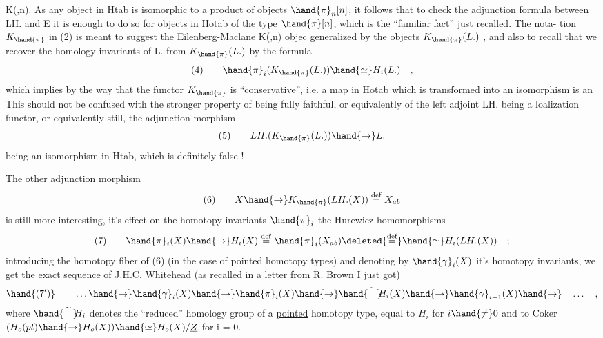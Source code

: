 K(\hand{$\pi$},n). As any object in Htab  is isomorphic to a
product of objects $\hand{\pi}_n[n]$, it follows that   to check the adjunction
formula between LH. and E it is enough to do so for objects in Hotab
of the type $\hand{\pi}[n]$, which is the ``familiar fact'' just recalled. The nota-%
tion $K_{\hand{\pi}}$ in (2) is meant to suggest the Eilenberg-Maclane K(\hand{$\pi$},n) objec
generalized by the objects $K_{\hand{\pi}}(L.)$ , and also to recall that we recover
the homology invariants of  L. from $K_{\hand{\pi}}(L.)$  by the formula
\[
(4) \qquad \hand{\pi}_i(K_{\hand{\pi}}(L.)) \hand{\simeq} H_i(L.) \quad ,
\]
which implies by the way that the functor $K_{\hand{\pi}}$ is ``conservative'', i.e.
a map in Hotab which is transformed into an isomorphism is an 
This should not be confused with the stronger property of being fully
faithful, or equivalently of the left adjoint LH. being a loalization
functor, or equivalently still, the adjunction morphism
\[
(5) \qquad LH.(K_{\hand{\pi}}(L.)) \hand{\to} L.
\]
being an isomorphism in Htab, which is definitely false !

The other adjunction morphism
\[
(6) \qquad X \hand{\to} K_{\hand{\pi}}(LH.(X)) \overset{\mathrm{def}}{=} X_{ab}
\]
is still more interesting, it's effect on the homotopy invariants $\hand{\pi}_i$ 
the Hurewicz  homomorphisms
\[
(7) \qquad \hand{\pi}_i(X) \hand{\to} H_i(X) \overset{\mathrm{def}}{=} \hand{\pi}_i(X_{ab}) \deleted{\overset{\mathrm{def}}{=}}\hand{\simeq} H_i(LH.(X)) \quad ;
\]
 introducing the homotopy fiber of (6) (in the case of pointed
homotopy types) and denoting by $\hand{\gamma}_i(X)$ it's homotopy invariants, we get
the exact sequence of J.H.C. Whitehead (as recalled in a letter from R.
Brown I just got)
\[
\hand{(7')} \qquad \dots \hand{\to} \hand{\gamma}_i(X) \hand{\to} \hand{\pi}_i(X) \hand{\to} \hand{\widetilde{\phantom{H}}}\!\!H_i(X) \hand{\to} \hand{\gamma}_{i-1}(X) \hand{\to} \quad \dots \quad ,
\]
where $\hand{\widetilde{\phantom{H}}}\!\!H_i$ denotes the ``reduced'' homology group of a \uline{pointed} homotopy
type, equal to $H_i$ for $i\hand{\neq}0$ and to Coker $(H_o(pt) \hand{\to} H_o(X)) \hand{\simeq} H_o(X)/\underline{Z}$ for
i = 0.

